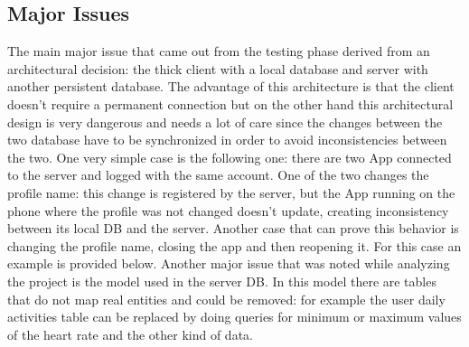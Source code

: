 \subsection{Major Issues}
The main major issue that came out from the testing phase derived from an architectural decision: the thick client with a local database and server with another persistent database. The advantage of this architecture is that the client doesn't require a permanent connection but on the other hand this architectural design is very dangerous and needs a lot of care since the changes between the two database have to be synchronized in order to avoid inconsistencies between the two.
One very simple case is the following one: there are two App connected to the server and logged with the same account. One of the two changes the profile name: this change is registered by the server, but the App running on the phone where the profile was not changed doesn't update, creating inconsistency between its local DB and the server.
Another case that can prove this behavior is changing the profile name, closing the app and then reopening it. For this case an example is provided below.
Another major issue that was noted while analyzing the project is the model used in the server DB. In this model there are tables that do not map real entities and could be removed: for example the user daily activities table can be replaced by doing queries for minimum or maximum values of the heart rate and the other kind of data.


